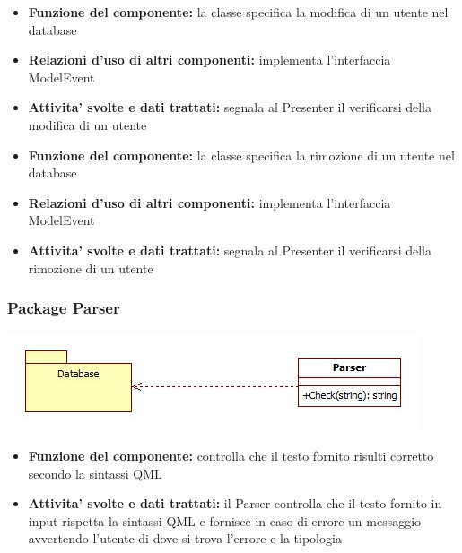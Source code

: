 \documentclass[a4paper,11pt]{article}
\begin{document}
			\begin{itemize}
		    	\item\textbf{Funzione del componente:} la classe specifica la modifica di un utente nel database
				\item\textbf{Relazioni d'uso di altri componenti:} implementa l'interfaccia ModelEvent
				\item\textbf{Attivita' svolte e dati trattati:} segnala al Presenter il verificarsi della modifica di un utente
			\end{itemize}
			\begin{itemize}
		    	\item\textbf{Funzione del componente:} la classe specifica la rimozione di un utente nel database
				\item\textbf{Relazioni d'uso di altri componenti:} implementa l'interfaccia ModelEvent
				\item\textbf{Attivita' svolte e dati trattati:} segnala al Presenter il verificarsi della rimozione di un utente
			\end{itemize}
			
			\subsubsection{Package Parser}
			\begin{center}
				\includegraphics[scale=0.6]{../images/Parser.jpg}
			\end{center}
 			\begin{itemize}
		    	\item\textbf{Funzione del componente:} controlla che il testo fornito risulti corretto secondo la sintassi QML
			\item\textbf{Attivita' svolte e dati trattati:} il Parser controlla che il testo fornito in input rispetta la sintassi QML e fornisce in caso di errore un messaggio avvertendo l'utente di dove si trova l'errore e la tipologia
			\end{itemize}
			
\end{document}
